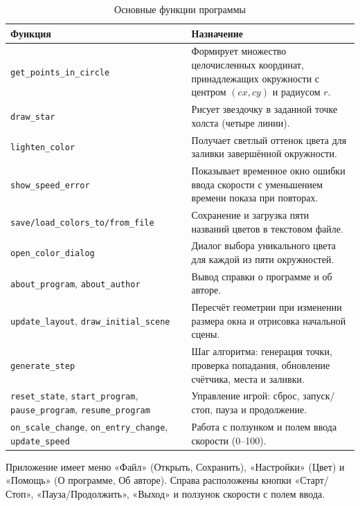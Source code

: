 \documentclass[oneside,a4paper,14pt]{extarticle}
\begin{document}
	\begin{table}[H]
		\centering
		\small
		\caption{Основные функции программы}
		\begin{tabular}{|p{4.6cm}|p{10.4cm}|}
			\hline
			\textbf{Функция} & \textbf{Назначение}\\
			\hline
			\texttt{get\_points\_in\_circle} & Формирует множество целочисленных координат, принадлежащих окружности с центром $(cx, cy)$ и радиусом $r$.\\
			\hline
			\texttt{draw\_star} & Рисует звездочку в заданной точке холста (четыре линии).\\
			\hline
			\texttt{lighten\_color} & Получает светлый оттенок цвета для заливки завершённой окружности.\\
			\hline
			\texttt{show\_speed\_error} & Показывает временное окно ошибки ввода скорости с уменьшением времени показа при повторах.\\
			\hline
			\texttt{save/load\_colors\_to/from\_file} & Сохранение и загрузка пяти названий цветов в текстовом файле.\\
			\hline
			\texttt{open\_color\_dialog} & Диалог выбора уникального цвета для каждой из пяти окружностей.\\
			\hline
			\texttt{about\_program}, \texttt{about\_author} & Вывод справки о программе и об авторе.\\
			\hline
			\texttt{update\_layout}, \texttt{draw\_initial\_scene} & Пересчёт геометрии при изменении размера окна и отрисовка начальной сцены.\\
			\hline
			\texttt{generate\_step} & Шаг алгоритма: генерация точки, проверка попадания, обновление счётчика, места и заливки.\\
			\hline
			\texttt{reset\_state}, \texttt{start\_program}, \texttt{pause\_program}, \texttt{resume\_program} & Управление игрой: сброс, запуск/стоп, пауза и продолжение.\\
			\hline
			\texttt{on\_scale\_change}, \texttt{on\_entry\_change}, \texttt{update\_speed} & Работа с ползунком и полем ввода скорости (0--100).\\
			\hline
		\end{tabular}
	\end{table}
	
	Приложение имеет меню «Файл» (Открыть, Сохранить), «Настройки» (Цвет) и «Помощь» (О программе, Об авторе). Справа расположены кнопки «Старт/Стоп», «Пауза/Продолжить», «Выход» и ползунок скорости с полем ввода.
	
	\newpage
	
\end{document}
